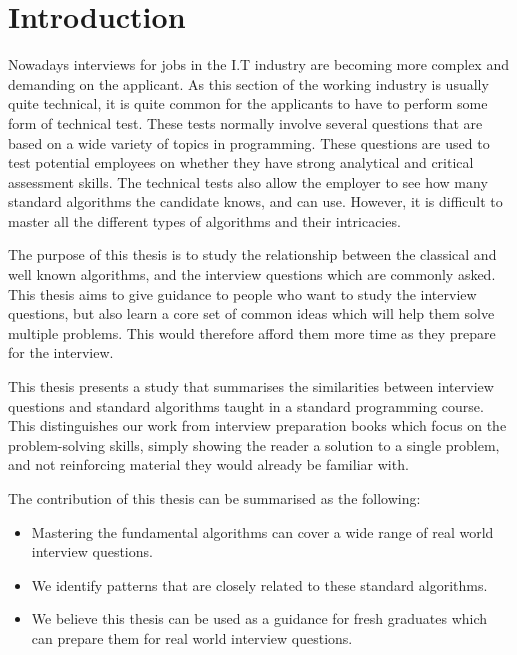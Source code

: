\documentclass[10pt,twocolumn,hidelinks]{IEEEtran}
\begin{document}
\section{Introduction}
\label{sec:intro}
\par
Nowadays interviews for jobs in the I.T industry are becoming more complex and demanding on the applicant. As this section of the working industry is usually quite technical, it is quite common for the applicants to have to perform some form of technical test. These tests normally involve several questions that are based on a wide variety of topics in programming. These questions are used to test potential employees on whether they have strong analytical and critical assessment skills. The technical tests also allow the employer to see how many standard algorithms the candidate knows, and can use. However, it is difficult to master all the different types of algorithms and their intricacies. 
\par The purpose of this thesis is to study the relationship between the classical and well known algorithms, and the interview questions which are commonly asked.  This thesis aims to give guidance to people who want to study the interview questions, but also learn a core set of common ideas which will help them solve multiple problems. This would therefore afford them more time as they prepare for the interview.
\par This thesis presents a study that summarises the similarities between interview questions and standard algorithms taught in a standard programming course. This distinguishes our work from interview preparation books which focus on the problem-solving skills, simply showing the reader a solution to a single problem, and not reinforcing material they would already be familiar with. 
\par The contribution of this thesis can be summarised as the following: 
\begin{itemize}
\item Mastering the fundamental algorithms can cover a wide range of real world interview questions. 
\item We identify patterns that are closely related to these standard algorithms. 
\item We believe this thesis can be used as a guidance for fresh graduates which can prepare them for real world interview questions.  
\end{itemize}
\end{document}
